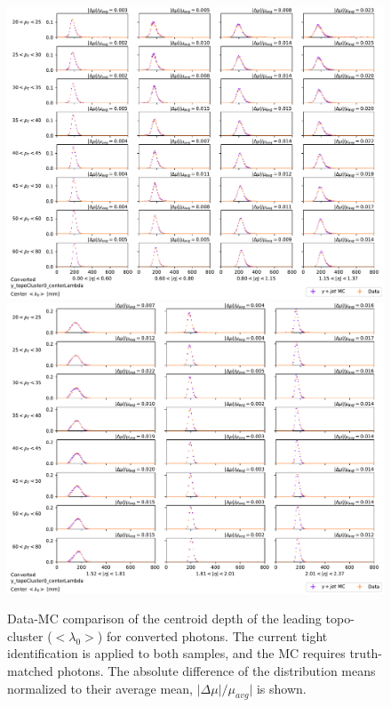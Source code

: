 \begin{figure}[!thp]
    \centering
    \includegraphics[width=.74\textwidth]{appendices/datamc_images/y_topoCluster0_centerLambda_Converted_lowerEta.pdf}
    \includegraphics[width=.74\textwidth]{appendices/datamc_images/y_topoCluster0_centerLambda_Converted_upperEta.pdf}
    \caption[Data-MC comparison of the centroid depth of the leading topo-cluster ($<\lambda_{0}>$)or converted photons]{Data-MC comparison of the centroid depth of the leading topo-cluster ($<\lambda_{0}>$) for converted photons. The current tight identification is applied to both samples, and the \gls{MC} requires truth-matched photons. The absolute difference of the distribution means normalized to their average mean, $|\Delta \mu|/\mu_{avg}|$ is shown.}
    \label{fig:dmc-c-cl}
\end{figure}

